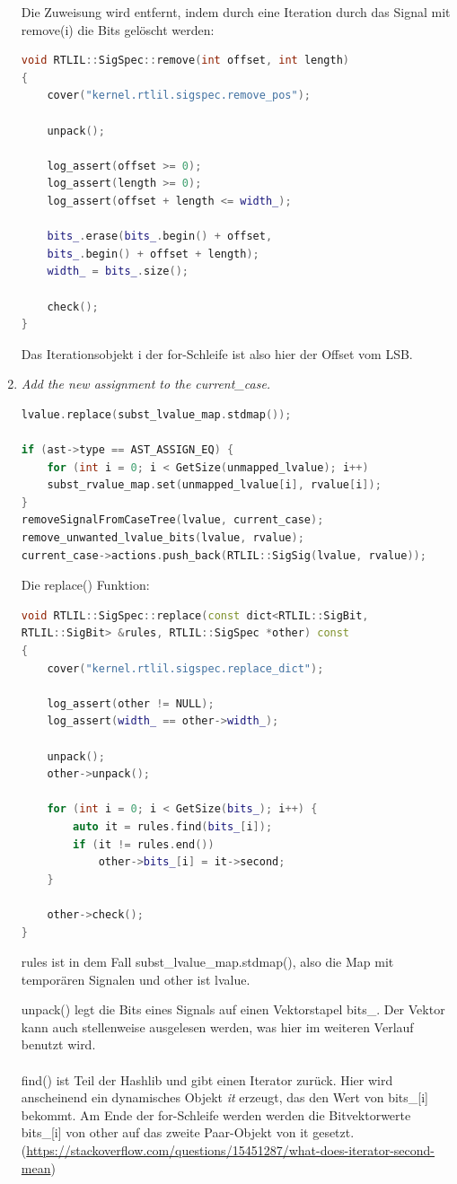 \documentclass[11pt]{report}
\begin{document}
\begin{enumerate}
Die Zuweisung wird entfernt, indem durch eine Iteration durch das Signal mit remove(i) die Bits gelöscht werden:
\begin{lstlisting}[language=C++]
void RTLIL::SigSpec::remove(int offset, int length)
{
	cover("kernel.rtlil.sigspec.remove_pos");

	unpack();

	log_assert(offset >= 0);
	log_assert(length >= 0);
	log_assert(offset + length <= width_);

	bits_.erase(bits_.begin() + offset, 
	bits_.begin() + offset + length);
	width_ = bits_.size();

	check();
}
\end{lstlisting}

Das Iterationsobjekt i der for-Schleife ist also hier der Offset vom LSB.


\item \textit{Add the new assignment to the current\_case.
}
\begin{lstlisting}[language=C++]
lvalue.replace(subst_lvalue_map.stdmap());

if (ast->type == AST_ASSIGN_EQ) {
	for (int i = 0; i < GetSize(unmapped_lvalue); i++)
	subst_rvalue_map.set(unmapped_lvalue[i], rvalue[i]);
}
removeSignalFromCaseTree(lvalue, current_case);
remove_unwanted_lvalue_bits(lvalue, rvalue);
current_case->actions.push_back(RTLIL::SigSig(lvalue, rvalue));
\end{lstlisting}

Die replace() Funktion:
\begin{lstlisting}[language=C++]
void RTLIL::SigSpec::replace(const dict<RTLIL::SigBit, 
RTLIL::SigBit> &rules, RTLIL::SigSpec *other) const
{
	cover("kernel.rtlil.sigspec.replace_dict");

	log_assert(other != NULL);
	log_assert(width_ == other->width_);

	unpack();
	other->unpack();

	for (int i = 0; i < GetSize(bits_); i++) {
		auto it = rules.find(bits_[i]);
		if (it != rules.end())
			other->bits_[i] = it->second;
	}

	other->check();
}
\end{lstlisting}

rules ist in dem Fall subst\_lvalue\_map.stdmap(), also die Map mit temporären Signalen und other ist lvalue.

unpack() legt die Bits eines Signals auf einen Vektorstapel bits\_. Der Vektor kann auch stellenweise ausgelesen werden, was hier im weiteren Verlauf benutzt wird.
\\
\\
find() ist Teil der Hashlib und gibt einen Iterator zurück. Hier wird anscheinend ein dynamisches Objekt \textit{it} erzeugt, das den Wert von bits\_[i] bekommt.
Am Ende der for-Schleife werden werden die Bitvektorwerte bits\_[i] von other auf das zweite Paar-Objekt von it gesetzt.\\
(\url{https://stackoverflow.com/questions/15451287/what-does-iterator-second-mean})

\end{enumerate}
\end{document}
